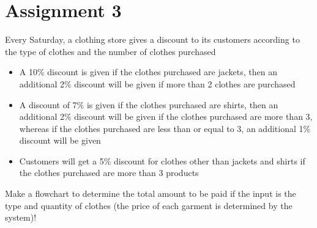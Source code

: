 \documentclass[12pt,titlepage]{article}
\begin{document}
\pagebreak

\section{Assignment 3}
Every Saturday, a clothing store gives a discount to its customers according to the
type of clothes and the number of clothes purchased
\begin{itemize}
    \item {
        A 10\% discount is given if the clothes purchased are jackets, then an additional
        2\% discount will be given if more than 2 clothes are purchased
    }
    \item {
        A discount of 7\% is given if the clothes purchased are shirts, then an additional
        2\% discount will be given if the clothes purchased are more than 3, whereas if
        the clothes purchased are less than or equal to 3, an additional 1\% discount will
        be given
    }
    \item {
        Customers will get a 5\% discount for clothes other than jackets and shirts if the
        clothes purchased are more than 3 products
    }
\end{itemize}
Make a flowchart to determine the total amount to be paid if the input is the type
and quantity of clothes (the price of each garment is determined by the system)!
\end{document}
